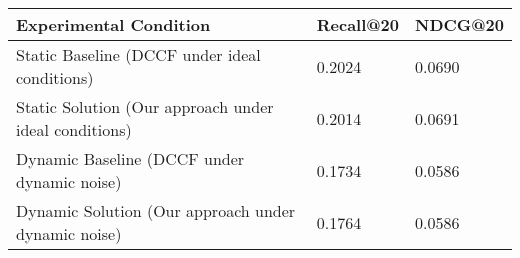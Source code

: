 \begin{tabular}{lll}
\toprule
Experimental Condition & Recall@20 & NDCG@20 \\
\midrule
Static Baseline (DCCF under ideal conditions) & 0.2024 & 0.0690 \\
Static Solution (Our approach under ideal conditions) & 0.2014 & 0.0691 \\
Dynamic Baseline (DCCF under dynamic noise) & 0.1734 & 0.0586 \\
Dynamic Solution (Our approach under dynamic noise) & 0.1764 & 0.0586 \\
\bottomrule
\end{tabular}
